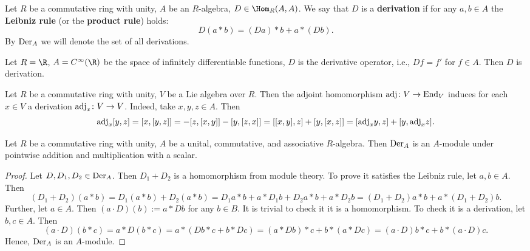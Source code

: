 \begin{definition}
  Let
    $R$ be a commutative ring with unity,
    $A$ be an $R$-algebra,
    $D \in \Hom_R(A, A)$.
  We say that $D$ is a \textbf{derivation} if for any $a, b \in A$ the
  \textbf{Leibniz rule} (or the \textbf{product rule}) holds:
  \begin{equation}
    D(a * b) = (D a) * b + a * (D b).
  \end{equation}
  By ${\rm Der}_A$ we will denote the set of all derivations.
\end{definition}
\begin{example}
  Let
    $R = \R$,
    $A = C^\infty(\R)$ be the space of infinitely differentiable functions,
    $D$ is the derivative operator, i.e., $D f = f'$ for $f \in A$.
  Then $D$ is derivation.
\end{example}
\begin{example}
  Let $R$ be a commutative ring with unity,
  $V$ be a Lie algebra over $R$.
  Then the adjoint homomorphism ${\rm adj} \colon V \to {\rm End}_V$ induces for
  each $x \in V$ a derivation ${\rm adj}_x \colon V \to V$.
  Indeed, take $x, y, z \in A$.
  Then
  \begin{equation}
    {\rm adj}_x [y, z]
    = [x, [y, z]]
    = - [z, [x, y]] - [y, [z, x]]
    = [[x, y], z] + [y, [x, z]]
    = [{\rm adj}_x y, z] + [y, {\rm adj}_x z].
  \end{equation}
\end{example}
\begin{proposition}
  Let $R$ be a commutative ring with unity,
  $A$ be a unital, commutative, and associative $R$-algebra.
  Then ${\rm Der}_A$ is an $A$-module under pointwise addition and
  multiplication with a scalar.
\end{proposition}
\begin{proof}
  Let $D, D_1, D_2 \in {\rm Der}_A$.
  Then $D_1 + D_2$ is a homomorphism from module theory.
  To prove it satisfies the Leibniz rule, let $a, b \in A$.
  Then
  \begin{equation}
    (D_1 + D_2)(a * b)
    = D_1(a * b) + D_2(a * b)
    = D_1 a * b + a * D_1 b + D_2 a * b + a * D_2 b
    = (D_1 + D_2) a * b + a * (D_1 + D_2) b.
  \end{equation}
  Further, let $a \in A$.
  Then $(a \cdot D)(b) := a * D b$ for any $b \in B$.
  It is trivial to check it it is a homomorphism.
  To check it is a derivation, let $b, c \in A$.
  Then
  \begin{equation}
    (a \cdot D)(b * c)
    = a * D(b * c)
    = a * (D b * c + b * D c)
    = (a * D b) * c + b * (a * D c)
    = (a \cdot D) b * c + b * (a \cdot D) c. 
  \end{equation}
  Hence, ${\rm Der}_A$ is an $A$-module.
\end{proof}
